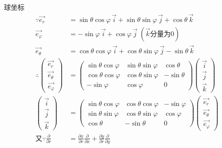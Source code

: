 \documentclass[12pt, UTF8, AutoFakeBold]{ctexart} %
\begin{document}
球坐标
\allowdisplaybreaks
\begin{align*}
    \because
    \vec{e_r} &= \sin\theta\cos\varphi\,\vec{i} + \sin\theta\sin\varphi\,\vec{j} + \cos\theta\,\vec{k}\\
    \vec{e_\varphi} &= -\sin\varphi\,\vec{i} + \cos\varphi\,\vec{j}\;(\vec{k}\text{分量为}0)\\
    \vec{e_\theta} &= \cos\theta\cos\varphi\,\vec{i} + \cos\theta\sin\varphi\,\vec{j} - \sin\theta\,\vec{k}\\
    \therefore
    \begin{pmatrix}
        \vec{e_r}\\
        \vec{e_\theta}\\
        \vec{e_\varphi}
    \end{pmatrix}
    &=
    \begin{pmatrix}
        \sin\theta\cos\varphi & \sin\theta\sin\varphi & \cos\theta\\
        \cos\theta\cos\varphi & \cos\theta\sin\varphi & -\sin\theta\\
        -\sin\varphi & \cos\varphi & 0
    \end{pmatrix}
    \begin{pmatrix}
        \vec{i}\\
        \vec{j}\\
        \vec{k}
    \end{pmatrix}\\
    \begin{pmatrix}
        \vec{i}\\
        \vec{j}\\
        \vec{k}
    \end{pmatrix}
    &=
    \begin{pmatrix}
        \sin\theta\cos\varphi & \cos\theta\cos\varphi & -\sin\varphi\\
        \sin\theta\sin\varphi & \cos\theta\sin\varphi & \cos\varphi\\
        \cos\theta & -\sin\theta & 0
    \end{pmatrix}
    \begin{pmatrix}
        \vec{e_r}\\
        \vec{e_\theta}\\
        \vec{e_\varphi}
    \end{pmatrix}\\
    \text{又}\because
    \frac{\partial}{\partial r} &= \frac{\partial x}{\partial r}\frac{\partial}{\partial x}
    + \frac{\partial y}{\partial r}\frac{\partial}{\partial y}

\end{align*}
\end{document}
